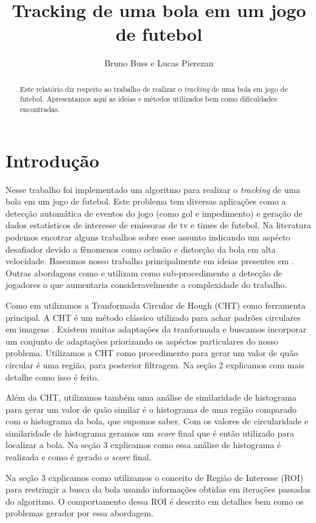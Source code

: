 \documentclass[11pt,a4paper]{article}
\title{Tracking de uma bola em um jogo de futebol}
\author{Bruno Buss e Lucas Pierezan}
\begin{document}
\maketitle

\begin{abstract}
 Este relatório diz respeito ao trabalho de realizar o \textit{tracking} de uma bola em jogo de futebol. Apresentamos aqui as ideias e métodos utilizados bem como dificuldades encontradas.
\end{abstract}

\section{Introdução}
 Nesse trabalho foi implementado um algoritmo para realizar o \textit{tracking} de uma bola em um jogo de futebol. Este problema tem diversas aplicações como a detecção automática de eventos do jogo (como gol e impedimento) e geração de dados estatísticos de interesse de emissoras de tv e times de futebol. Na literatura podemos encotrar alguns trabalhos sobre esse assunto \cite{}\cite{}\cite{} indicando um aspécto desafiador devido a fênomenos como oclusão e distorção da bola em alta velocidade. Baseamos nosso trabalho principalmente em ideias presentes em \cite{}. Outras abordagens como \cite{} e \cite{} utilizam como sub-procedimento a detecção de jogadores o que aumentaria consideravelmente a complexidade do trabalho.

Como em \cite{} utilizamos a Tranformada Circular de Hough (CHT) como ferramenta principal. A CHT é um método clássico utilizado para achar padrões circulares em imagens \cite{}. Existem muitas adaptações da tranformada\cite{} e buscamos incorporar um conjunto de adaptações priorizando os aspéctos particulares do nosso problema. Utilizamos a CHT como procedimento para gerar um valor de quão circular é uma região, para posterior filtragem. Na seção 2 explicamos com mais detalhe como isso é feito.

Além da CHT, utilizamos também uma análise de similaridade de histograma para gerar um valor de quão similar é o histograma de uma região comparado com o histograma da bola, que supomos saber. Com os valores de circularidade e similaridade de histograma geramos um \textit{score} final que é então utilizado para localizar a bola. Na seção 3 explicamos como essa análise de histograma é realizada e como é gerado o \textit{score} final.

Na seção 3 explicamos como utilizamos o conceito de Região de Interesse (ROI) para restringir a busca da bola usando informações obtidas em iterações passadas do algoritmo. O comportamento dessa ROI é descrito em detalhes bem como os problemas gerador por essa abordagem.
\end{document}
